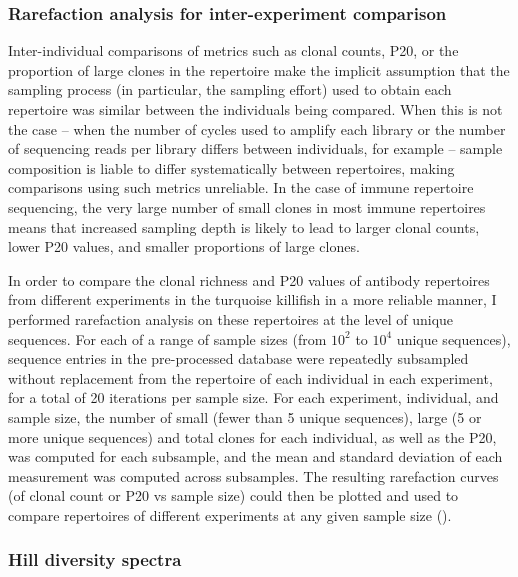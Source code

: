 \subsubsection{Rarefaction analysis for inter-experiment comparison}
\label{sec:methods_comp_igdownstream_rarefaction}

Inter-individual comparisons of metrics such as clonal counts, P20, or the proportion of large clones in the repertoire make the implicit assumption that the sampling process (in particular, the sampling effort) used to obtain each repertoire was similar between the individuals being compared. When this is not the case -- when the number of cycles used to amplify each library or the number of sequencing reads per library differs between individuals, for example -- sample composition is liable to differ systematically between repertoires, making comparisons using such metrics unreliable. In the case of immune repertoire sequencing, the very large number of small clones in most immune repertoires  \parencite{mora2016diversity} means that increased sampling depth is likely to lead to larger clonal counts, lower P20 values, and smaller proportions of large clones.

In order to compare the clonal richness and P20 values of antibody repertoires from different \igseq experiments in the turquoise killifish in a more reliable manner, I performed rarefaction analysis \parencite{gotelli2001rarefaction} on these repertoires at the level of unique sequences. For each of a range of sample sizes (from $10^2$ to $10^4$ unique sequences), sequence entries in the pre-processed  database were repeatedly subsampled without replacement from the repertoire of each individual in each experiment, for a total of 20 iterations per sample size. For each experiment, individual, and sample size, the number of small (fewer than 5 unique sequences), large (5 or more unique sequences) and total clones for each individual, as well as the P20, was computed for each subsample, and the mean and standard deviation of each measurement was computed across subsamples. The resulting rarefaction curves (of clonal count or P20 vs sample size) could then be plotted and used to compare repertoires of different experiments at any given sample size ().

\subsubsection{Hill diversity spectra}
\label{sec:methods_comp_igdownstream_spectra}

